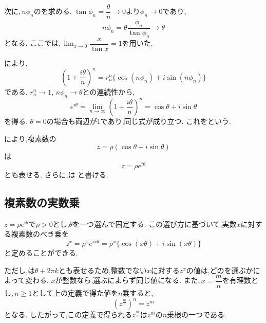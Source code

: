     次に,\,$n\phi_n$のを求める.
    $\tan\phi_n=\dfrac{\theta}{n}\to0$より$\phi_n\to0$であり,
    \[
      n\phi_n
      =
      \theta\frac{\phi_n}{\tan\phi_n}
      \longrightarrow\theta
    \]
    となる.
    ここでは,\,$\lim_{x\to0}\dfrac{x}{\tan x}=1$を用いた.

    により,
    \[
      \left(1+\frac{i\theta}{n}\right)^n
      =
      r_n^n
      \{\cos(n\phi_n)+i\sin(n\phi_n)\}
    \]
    である.
    $r_n^n\to1,\,n\phi_n\to\theta$との連続性から,
    \[
      e^{i\theta}
      =
      \lim_{n\to\infty}
      \left(1+\frac{i\theta}{n}\right)^n
      =
      \cos\theta+i\sin\theta
    \]
    を得る.
    $\theta=0$の場合も両辺が$1$であり,同じ式が成り立つ.
    これをという.

    により,複素数の
    \[
      z=\rho(\cos\theta+i\sin\theta)
    \]
    は
    \[
      z=\rho e^{i\theta}
    \]
    とも表せる.
    さらに,は
\BookMathLayout{\[
      z^n
      =
      \rho^n e^{in\theta}
      =
      \rho^n\{\cos(n\theta)+i\sin(n\theta)\}
      \qquad(n\in\mathbb Z)
    \]}{
\[
\begin{aligned}
z^n&=\rho^n e^{in\theta}\\
&=\rho^n\{\cos(n\theta)+i\sin(n\theta)\}\\
&\hspace{5zw}(n\in\mathbb Z)
\end{aligned}
\]
}
    と書ける.

  \subsection{複素数の実数乗}\label{節：複素数の実数乗}
    $z=\rho e^{i\theta}$で$\rho>0$とし,$\theta$を一つ選んで固定する.
    この選び方に基づいて,実数$x$に対する複素数のべき乗を
    \[
      z^x=\rho^x e^{ix\theta}
      =
      \rho^x\{\cos(x\theta)+i\sin(x\theta)\}
    \]
    と定めることができる.

    ただし,は$\theta+2\pi k$とも表せるため,整数でない$x$に対する$z^x$の値は,どのを選ぶかによって変わる.
    $x$が整数なら,選ぶによらず同じ値になる.
    また,\,$x=\dfrac{m}{n}$を有理数とし,\,$n\ge1$として上の定義で得た値を$n$乗すると,
    \[
      (z^{\frac{m}{n}})^n=z^m
    \]
    となる.
    したがって,この定義で得られる$z^{\displaystyle \frac{m}{n}}$は$z^m$の$n$乗根の一つである.

